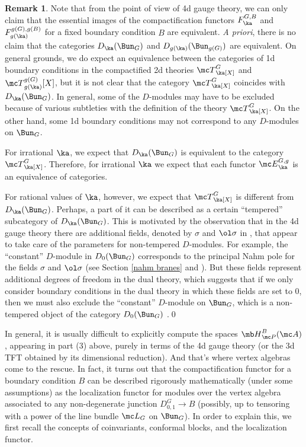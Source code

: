 \documentclass[11pt,reqno]{amsart}
\theoremstyle{plain}
\numberwithin{equation}{section}
\theoremstyle{definition}
\newtheorem{rem}{Remark}[section]
\begin{document}
\begin{rem}    \label{rational}
Note that from the point of view of 4d gauge theory, we can only claim
that the essential images of the compactification functors
$F^{G,B}_\ka$ and $F^{g(G),g(B)}_{g(\ka)}$ for a fixed boundary
condition $B$ are equivalent. {\em A priori}, there is no claim that
the categories $D_\ka(\Bun_G)$ and $D_{g(\ka)}(\Bun_{g(G)})$ are
equivalent. On general grounds, we do expect an equivalence between
the categories of 1d boundary conditions in the compactified 2d theories
${\mc T}^G_\ka[X]$ and ${\mc T}^{g(G)}_{g(\ka)}[X]$, but it is not
clear that the category ${\mc T}^G_\ka[X]$ coincides with
$D_\ka(\Bun_G)$. In general, some of the $D$-modules may have to be
excluded because of various subtleties with the definition of the
theory ${\mc T}^G_\ka[X]$. On the other hand, some 1d boundary
conditions may not correspond to any $D$-modules on $\Bun_G$.

For irrational $\ka$, we expect that $D_\ka(\Bun_G)$ is equivalent to the
category ${\mc T}^G_\ka[X]$. Therefore, for irrational $\ka$ we expect
that each functor ${\mc E}^{G,g}_\ka$ is an equivalence of categories.

For rational values of $\ka$, however, we expect that ${\mc
  T}^G_\ka[X]$ is different from $D_\ka(\Bun_G)$. Perhaps, a part of
it can be described as a certain ``tempered'' subcategory of
$D_\ka(\Bun_G)$. This is motivated by the observation that in the 4d
gauge theory there are additional fields, denoted by $\sigma$ and
$\ol\sigma$ in \cite{KW}, that appear to take care of the parameters
for non-tempered $D$-modules. For example, the ``constant'' $D$-module
in $D_0(\Bun_G)$ corresponds to the principal Nahm pole for the fields
$\sigma$ and $\ol\sigma$ (see Section \ref{nahm branes} and
\cite{F:bourbaki}). But these fields represent additional degrees of
freedom in the dual theory, which suggests that if we only consider
boundary conditions in the dual theory in which these fields are set
to $0$, then we must also exclude the ``constant'' $D$-module on
$\Bun_G$, which is a non-tempered object of the category $D_0(\Bun_G)$
\cite{AG, EY2}.\qed
\end{rem}

\medskip

In general, it is usually difficult to explicitly compute the spaces
${\mb H}^B_{\mc P}({\mc A})$, appearing in part (3) above, purely in
terms of the 4d gauge theory (or the 3d TFT obtained by its
dimensional reduction). And that's where vertex algebras come to the
rescue. In fact, it turns out that the compactification functor for a
boundary condition $B$ can be described rigorously mathematically
(under some assumptions) as the localization functor for modules over
the vertex algebra associated to any non-degenerate junction
$D^G_{0,1} \to B$ (possibly, up to tensoring with a power of the line
bundle ${\mc L}_G$ on $\Bun_G$). In order to explain this, we first
recall the concepts of coinvariants, conformal blocks, and the
localization functor.
\end{document}
